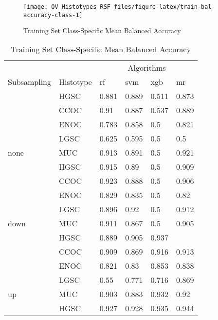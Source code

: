 \documentclass[
]{report}
\begin{document}
\begin{figure}[H]

{\centering \texttt{[image: OV\_Histotypes\_RSF\_files/figure-latex/train-bal-accuracy-class-1]} 

}

\caption{Training Set Class-Specific Mean Balanced Accuracy}\label{fig:train-bal-accuracy-class}
\end{figure}

\begin{table}

\caption{\label{tab:train-bal-accuracy-class-table}Training Set Class-Specific Mean Balanced Accuracy}
\centering
\begin{tabular}[t]{l|l|l|l|l|l}
\hline
\multicolumn{2}{c|}{ } & \multicolumn{4}{c}{Algorithms} \\
\cline{3-6}
Subsampling & Histotype & rf & svm & xgb & mr\\
\hline
 & HGSC & 0.881 & 0.889 & 0.511 & 0.873\\
\cline{2-6}
 & CCOC & 0.91 & 0.887 & 0.537 & 0.889\\
\cline{2-6}
 & ENOC & 0.783 & 0.858 & 0.5 & 0.821\\
\cline{2-6}
 & LGSC & 0.625 & 0.595 & 0.5 & 0.5\\
\cline{2-6}
\multirow{-5}{*}{\raggedright\arraybackslash none} & MUC & 0.913 & 0.891 & 0.5 & 0.921\\
\cline{1-6}
 & HGSC & 0.915 & 0.89 & 0.5 & 0.909\\
\cline{2-6}
 & CCOC & 0.923 & 0.888 & 0.5 & 0.906\\
\cline{2-6}
 & ENOC & 0.829 & 0.835 & 0.5 & 0.82\\
\cline{2-6}
 & LGSC & 0.896 & 0.92 & 0.5 & 0.912\\
\cline{2-6}
\multirow{-5}{*}{\raggedright\arraybackslash down} & MUC & 0.911 & 0.867 & 0.5 & 0.905\\
\cline{1-6}
 & HGSC & 0.889 & 0.905 & 0.937 & \cellcolor[HTML]{90ee90}{0.946}\\
\cline{2-6}
 & CCOC & 0.909 & 0.869 & 0.916 & 0.913\\
\cline{2-6}
 & ENOC & 0.821 & 0.83 & 0.853 & 0.838\\
\cline{2-6}
 & LGSC & 0.55 & 0.771 & 0.716 & 0.869\\
\cline{2-6}
\multirow{-5}{*}{\raggedright\arraybackslash up} & MUC & 0.903 & 0.883 & 0.932 & 0.92\\
\cline{1-6}
 & HGSC & 0.927 & 0.928 & 0.935 & 0.944\\

\end{tabular}
\end{table}
\end{document}
